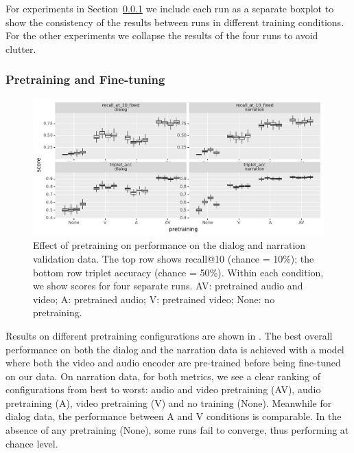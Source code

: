 For experiments in Section~\ref{sec:pretraining} we include each run as a separate boxplot
to show the consistency of the results between runs in
different training conditions.  For the other experiments we collapse
the results of the four runs to avoid clutter.

\subsubsection{Pretraining and Fine-tuning}
\label{sec:pretraining}
\begin{figure}[htb]
	\centering
	\includegraphics[width=\textwidth]{results/ablations/pretraining.pdf}
	\caption{Effect of pretraining on performance on the dialog
          and narration validation data. The top row shows recall@10
          (chance = 10\%); the bottom row triplet accuracy (chance =
          50\%). Within each condition, we show scores for four
          separate runs. AV: pretrained audio and video; A: pretrained
          audio; V: pretrained video; None: no pretraining.}
	\label{fig:pretraining}
      \end{figure}

Results on different pretraining configurations are shown in
.
The best overall performance on both the dialog and the narration data is 
achieved with a model where both the video and audio encoder are pre-trained 
before being fine-tuned on our data. On narration data, for both metrics,
we see a clear ranking of
configurations from best to worst: audio and video pretraining (AV), 
audio pretraining (A), video pretraining (V) and no training (None). 
Meanwhile for dialog data, the performance between A and V conditions
is comparable. In the absence of any pretraining (None),
some runs fail to converge, thus performing at chance level.

